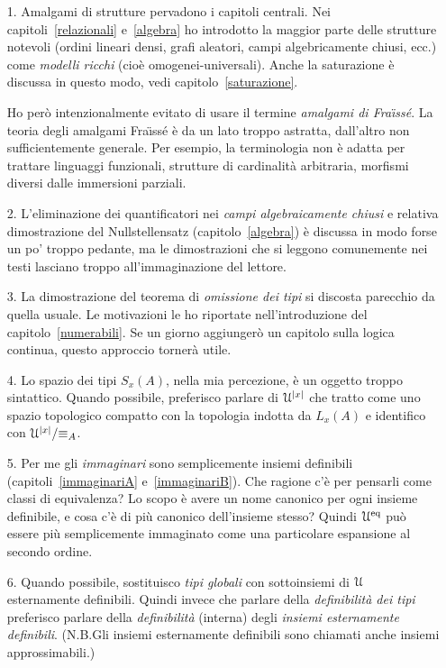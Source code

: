 \begin{itemize}
\item[1.] Amalgami di strutture pervadono i capitoli centrali. Nei capitoli~\ref{relazionali} e~\ref{algebra} ho introdotto la maggior parte delle strutture notevoli (ordini lineari densi, grafi aleatori, campi algebricamente chiusi, ecc.) come \emph{modelli ricchi\/} (cio\`e omogenei-universali). Anche la saturazione \`e discussa in questo modo, vedi capitolo~\ref{saturazione}.\medskip

Ho per\`o intenzionalmente evitato di usare il termine \emph{amalgami di Fra\"\i ss\'e}. La teoria degli amalgami Fra\"\i ss\'e \`e da un lato troppo astratta, dall'altro non sufficientemente generale. Per esempio, la terminologia non \`e adatta per trattare linguaggi funzionali, strutture di cardinalit\`a arbitraria, morfismi diversi dalle immersioni parziali.

\item[2.] L'eliminazione dei quantificatori nei \emph{campi algebraicamente chiusi\/} e relativa dimostrazione del Nullstellensatz (capitolo~\ref{algebra}) \`e discussa in modo forse un po' troppo pedante, ma le dimostrazioni che si leggono comunemente nei testi lasciano troppo all'immaginazione del lettore.

\item[3.] La dimostrazione del teorema di \emph{omissione dei tipi} si discosta parecchio da quella usuale. Le motivazioni le ho riportate nell'introduzione del capitolo~\ref{numerabili}. Se un giorno aggiunger\`o un capitolo sulla logica continua, questo approccio torner\`a utile.

\item[4.]   Lo spazio dei tipi \emph{$S_x(A)$}, nella mia percezione,  \`e un oggetto troppo sintattico. Quando possibile, preferisco parlare di $\EuScript U^{|x|}$ che tratto come uno spazio topologico compatto con la topologia indotta da $L_x(A)$ e identifico con $\EuScript U^{|x|}/{\equiv}_A$.

\item[5.]
Per me gli \emph{immaginari\/} sono semplicemente insiemi definibili (capitoli~\ref{immaginariA} e~\ref{immaginariB}). Che ragione c'\`e per pensarli come classi di equivalenza? Lo scopo \`e avere un nome canonico per ogni insieme definibile, e cosa c'\`e di pi\`u canonico dell'insieme stesso? Quindi $\EuScript U^{\rm eq}$ pu\`o essere pi\`u semplicemente immaginato come una particolare espansione al secondo ordine.

\item[6.] Quando possibile, sostituisco \emph{tipi globali\/} con sottoinsiemi di $\EuScript U$ esternamente definibili. Quindi invece che parlare della \emph{definibilit\`a dei tipi\/} preferisco parlare della \emph{definibilit\`a\/} (interna) degli \emph{insiemi esternamente definibili}. (N.B.\@ Gli insiemi esternamente definibili sono chiamati anche insiemi approssimabili.)


\end{itemize}
